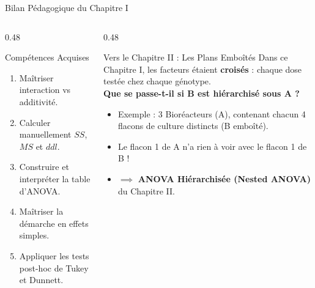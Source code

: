 \documentclass[aspectratio=169,10pt]{beamer}
\begin{document}
\begin{frame}{Bilan Pédagogique du Chapitre I}
  \begin{columns}[onlytextwidth, T]
    \begin{column}{0.48\linewidth}
      \begin{conceptbox}{Compétences Acquises}
        \small
        \begin{enumerate}
          \item Maîtriser interaction vs additivité.
          \item Calculer manuellement $SS$, $MS$ et $ddl$.
          \item Construire et interpréter la table d'ANOVA.
          \item Maîtriser la démarche en effets simples.
          \item Appliquer les tests post-hoc de Tukey et Dunnett.
        \end{enumerate}
      \end{conceptbox}
    \end{column}
    \begin{column}{0.48\linewidth}
      \begin{takeawaybox}{Vers le Chapitre II : Les Plans Emboîtés}
        \small
        Dans ce Chapitre I, les facteurs étaient \textbf{croisés} : chaque dose testée chez chaque génotype.\\
        \vspace{1mm}
        \textbf{Que se passe-t-il si B est hiérarchisé sous A ?}
        \begin{itemize}
          \item Exemple : 3 Bioréacteurs (A), contenant chacun 4 flacons de culture distincts (B emboîté).
          \item Le flacon 1 de A n'a rien à voir avec le flacon 1 de B !
          \item $\implies$ \textbf{ANOVA Hiérarchisée (Nested ANOVA)} du Chapitre II.
        \end{itemize}
      \end{takeawaybox}
    \end{column}
  \end{columns}
\end{frame}
\end{document}
